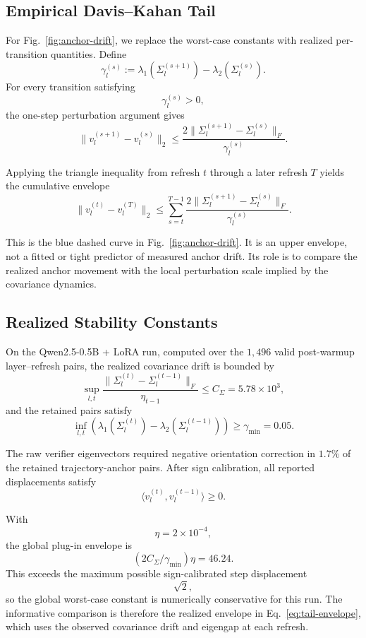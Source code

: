 \subsection{Empirical Davis--Kahan Tail}
\label{app:proof-envelope}

For Fig.~\ref{fig:anchor-drift}, we replace the worst-case constants
with realized per-transition quantities. Define
\[
\gamma_l^{(s)}
:=
\lambda_1(\Sigma_l^{(s+1)})
-
\lambda_2(\Sigma_l^{(s)}).
\]
For every transition satisfying
\[
\gamma_l^{(s)}>0,
\]
the one-step perturbation argument gives
\[
\|v_l^{(s+1)}-v_l^{(s)}\|_2
\le
\frac{
2\|\Sigma_l^{(s+1)}-\Sigma_l^{(s)}\|_F
}{
\gamma_l^{(s)}
}.
\]

Applying the triangle inequality from refresh \(t\) through a later
refresh \(T\) yields the cumulative envelope
\begin{equation}
\|v_l^{(t)}-v_l^{(T)}\|_2
\le
\sum_{s=t}^{T-1}
\frac{
2\|\Sigma_l^{(s+1)}-\Sigma_l^{(s)}\|_F
}{
\gamma_l^{(s)}
}.
\label{eq:tail-envelope}
\end{equation}

This is the blue dashed curve in Fig.~\ref{fig:anchor-drift}. It is an
upper envelope, not a fitted or tight predictor of measured anchor
drift. Its role is to compare the realized anchor movement with the
local perturbation scale implied by the covariance dynamics.


\subsection{Realized Stability Constants}
\label{app:stability-assumptions}

On the Qwen2.5-0.5B + LoRA run, computed over the \(1{,}496\) valid
post-warmup layer--refresh pairs, the realized covariance drift is
bounded by
\[
\sup_{l,t}
\frac{
\|\Sigma_l^{(t)}-\Sigma_l^{(t-1)}\|_F
}{
\eta_{t-1}
}
\le
C_\Sigma
=
5.78\times10^{3},
\]
and the retained pairs satisfy
\[
\inf_{l,t}
\left(
\lambda_1(\Sigma_l^{(t)})
-
\lambda_2(\Sigma_l^{(t-1)})
\right)
\ge
\gamma_{\min}
=
0.05 .
\]

The raw verifier eigenvectors required negative orientation correction
in \(1.7\%\) of the retained trajectory-anchor pairs. After sign
calibration, all reported displacements satisfy
\[
\langle v_l^{(t)},v_l^{(t-1)}\rangle\ge0 .
\]

With
\[
\eta=2\times10^{-4},
\]
the global plug-in envelope is
\[
(2C_\Sigma/\gamma_{\min})\eta
=
46.24 .
\]
This exceeds the maximum possible sign-calibrated step displacement
\[
\sqrt{2},
\]
so the global worst-case constant is numerically conservative for this
run. The informative comparison is therefore the realized envelope in
Eq.~\eqref{eq:tail-envelope}, which uses the observed covariance drift
and eigengap at each refresh.


